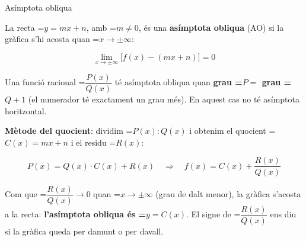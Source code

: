 \documentclass[11pt,a4paper]{article}
\newcommand{\fmm}[1]{\setbox0=\hbox{$#1$}\ifdim\wd0>\linewidth\[#1\]\else\mbox{\box0}\fi}
\newcommand{\fmuline}[1]{\textbf{\color{fmaccent}#1}}
\begin{document}
  
\begin{fmdef}{Asímptota obliqua}
\par\noindent \begin{minipage}[t]{0.48\linewidth}\vspace{0pt}\raggedright La recta \fmm{y=mx+n}, amb \fmm{m\neq0}, és una \textbf{asímptota obliqua} (AO) si la gràfica s'hi acosta quan \fmm{x\to\pm\infty}:

          
\[\lim_{x\to\pm\infty}\big[f(x)-(mx+n)\big]=0\]

          

Una funció racional \fmm{\dfrac{P(x)}{Q(x)}} té asímptota obliqua quan \textbf{grau \fmm{P=} grau \fmm{Q+1}} (el numerador té exactament un grau més). En aquest cas no té asímptota horitzontal.\end{minipage}\hfill\begin{minipage}[t]{0.48\linewidth}\vspace{0pt}\raggedright \begin{center}\end{center}\end{minipage}\par\medskip

      

\fmuline{Mètode del quocient}: dividim \fmm{P(x):Q(x)} i obtenim el quocient \fmm{C(x)=mx+n} i el residu \fmm{R(x)}:

      
\[P(x)=Q(x)\cdot C(x)+R(x)\quad\Longrightarrow\quad f(x)=C(x)+\frac{R(x)}{Q(x)}\]

      

Com que \fmm{\dfrac{R(x)}{Q(x)}\to0} quan \fmm{x\to\pm\infty} (grau de dalt menor), la gràfica s'acosta a la recta: \textbf{l'asímptota obliqua és \fmm{y=C(x)}}. El signe de \fmm{\dfrac{R(x)}{Q(x)}} ens diu si la gràfica queda per damunt o per davall.
\end{fmdef}
\end{document}
